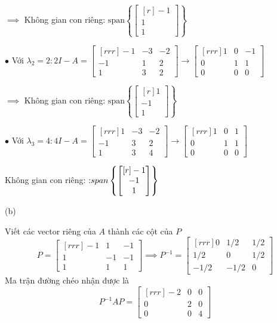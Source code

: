 \documentclass{article}
\begin{document}
    $\implies$ Không gian con riêng: $\text{span} \left\{ \begin{bmatrix}[r]
        -1 \\
        1 \\
        1
    \end{bmatrix}  \right\}$

    $\bullet$  Với $ \lambda _2 = 2: 2I - A = \begin{bmatrix}[rrr]
        -1 & -3 & -2 \\
        -1 & 1 & 2 \\
        1 & 3 & 2 
    \end{bmatrix} \to \begin{bmatrix}[rrr]
        1 & 0 & -1 \\
        0 & 1 & 1 \\
        0 & 0 & 0 
    \end{bmatrix} $

   $\implies$ Không gian con riêng: $\text{span} \left\{ \begin{bmatrix}[r]
        1 \\ -1 \\ 1
    \end{bmatrix}  \right\}$

    $\bullet$  Với $ \lambda _3 = 4 : 4I - A = \begin{bmatrix}[rrr]
        1 & -3 & -2 \\
        -1 & 3 & 2 \\
        1 & 3 & 4 
    \end{bmatrix} \to \begin{bmatrix}[rrr]
        1 &  0 & 1\\
        0 & 1 & 1 \\
        0 & 0 & 0 
    \end{bmatrix} $

    Không gian con riêng: $\text:span \left\{ \begin{bmatrix}[r]
        -1 \\
        -1 \\
        1 
    \end{bmatrix}  \right\}$

    (b) 

    Viết các vector riêng của $A$ thành các cột của $P$
    \[P =  \begin{bmatrix}[rrr]
        -1 & 1 & -1 \\
        1 & -1 & -1 \\
        1 & 1 & 1 
    \end{bmatrix} \implies P^{-1} = \begin{bmatrix}[rrr]
        0 & 1/2 & 1/2 \\
        1/2 & 0 & 1/2 \\
        -1/2 & -1/2 & 0 
    \end{bmatrix} \]
    Ma trận đường chéo nhận được là 
    \[P^{-1}AP = \begin{bmatrix}[rrr]
        -2 & 0 & 0 \\
        0 & 2 & 0 \\
        0 & 0 & 4 
    \end{bmatrix} \]
\end{document}

